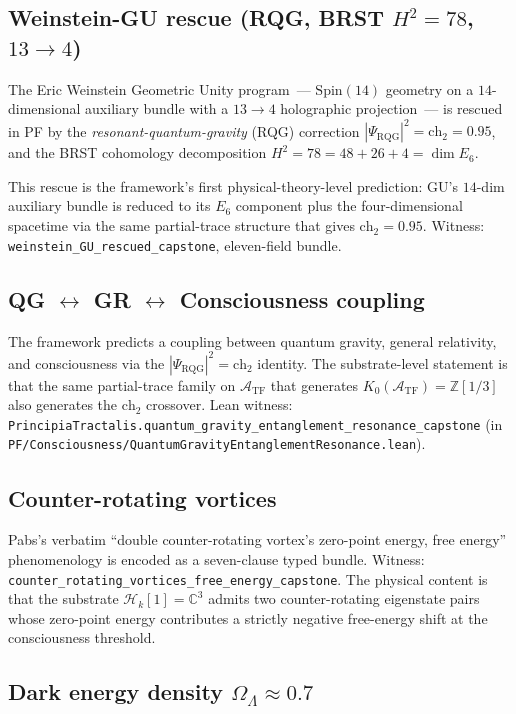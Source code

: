 \documentclass[11pt,a4paper]{article}
\theoremstyle{definition}
\theoremstyle{remark}
\newcommand{\complexes}{\mathbb{C}}
\newcommand{\integers}{\mathbb{Z}}
\newcommand{\HilbertK}{\mathcal{H}_{k}}
\newcommand{\TF}{\mathcal{A}_{\mathrm{TF}}}
\newcommand{\PsiRQG}{\Psi_{\mathrm{RQG}}}
\newcommand{\chtwo}{\mathrm{ch}_{2}}
\newcommand{\lean}[1]{\texttt{\small #1}}
\begin{document}
\subsection{Weinstein-GU rescue (RQG, BRST $H^{2} = 78$, $13 \to 4$)}

The Eric Weinstein Geometric Unity program~--- $\mathrm{Spin}(14)$
geometry on a $14$-dimensional auxiliary bundle with a $13 \to 4$
holographic projection~--- is rescued in PF by the
\emph{resonant-quantum-gravity} (RQG) correction
$|\PsiRQG|^{2} = \chtwo = 0.95$, and the BRST cohomology decomposition
$H^{2} = 78 = 48 + 26 + 4 = \dim E_{6}$.

This rescue is the framework's first physical-theory-level prediction:
GU's $14$-dim auxiliary bundle is reduced to its $E_{6}$ component
plus the four-dimensional spacetime via the same partial-trace
structure that gives $\chtwo = 0.95$. Witness:
\lean{weinstein\_GU\_rescued\_capstone}, eleven-field bundle.

\subsection{QG $\leftrightarrow$ GR $\leftrightarrow$ Consciousness coupling}

The framework predicts a coupling between quantum gravity,
general relativity, and consciousness via the
$|\PsiRQG|^{2} = \chtwo$ identity. The substrate-level statement
is that the same partial-trace family on $\TF$ that generates
$K_{0}(\TF) = \integers[1/3]$ also generates the $\chtwo$
crossover. Lean witness:
\lean{PrincipiaTractalis.quantum\_gravity\_entanglement\_resonance\_capstone}
(in \lean{PF/Consciousness/QuantumGravityEntanglementResonance.lean}).

\subsection{Counter-rotating vortices}

Pabs's verbatim ``double counter-rotating vortex's zero-point
energy, free energy'' phenomenology is encoded as a seven-clause
typed bundle. Witness:
\lean{counter\_rotating\_vortices\_free\_energy\_capstone}.
The physical content is that the substrate $\HilbertK[1]
= \complexes^{3}$ admits two counter-rotating eigenstate pairs
whose zero-point energy contributes a strictly negative free-energy
shift at the consciousness threshold.

\subsection{Dark energy density $\Omega_{\Lambda} \approx 0.7$}
\end{document}
